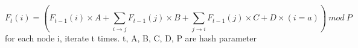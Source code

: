 $$F_t(i) = 
  (F_{t-1}(i) \times A + 
  \sum_{i\rightarrow j} F_{t-1}(j) \times B + 
  \sum_{j\rightarrow i} F_{t-1}(j) \times C +
  D \times (i = a))\ mod\ P
$$
for each node i, iterate t times.
t, A, B, C, D, P are hash parameter